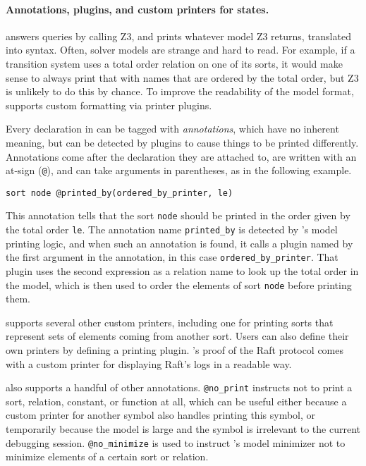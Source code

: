\paragraph{Annotations, plugins, and custom printers for states.}

\mypyvy answers queries by calling Z3,
  and \mypyvy prints whatever model Z3 returns, translated into \mypyvy syntax.
Often, solver models are strange and hard to read.
For example, if a transition system uses a total order relation on one of its sorts,
  it would make sense to always print that with names that are ordered by the total order,
  but Z3 is unlikely to do this by chance.
To improve the readability of the model format,
  \mypyvy supports custom formatting via printer plugins.

Every declaration in \mypyvy can be tagged with \emph{annotations},
  which have no inherent meaning,
  but can be detected by plugins to cause things to be printed differently.
Annotations come after the declaration they are attached to,
  are written with an at-sign (\lstinline[language=mypyvy]{@}),
  and can take arguments in parentheses, as in the following example.
\begin{lstlisting}[language=mypyvy, xleftmargin=.2\textwidth, xrightmargin=.2\textwidth]
  sort node @printed_by(ordered_by_printer, le)
\end{lstlisting}
This annotation tells \mypyvy that the sort \lstinline[language=mypyvy]{node}
  should be printed in the order given by the total order \lstinline[language=mypyvy]{le}.
The annotation name \lstinline[language=mypyvy]{printed_by}
  is detected by \mypyvy's model printing logic,
  and when such an annotation is found,
  it calls a plugin named by the first argument in the annotation,
  in this case \lstinline[language=mypyvy]{ordered_by_printer}.
That plugin uses the second expression as a relation name
  to look up the total order in the model,
  which is then used to order the elements of sort \lstinline[language=mypyvy]{node}
  before printing them.

\mypyvy supports several other custom printers,
  including one for printing sorts
  that represent sets of elements coming from another sort.
Users can also define their own printers by defining a printing plugin.
\mypyvy's proof of the Raft protocol comes with a custom printer
  for displaying Raft's logs in a readable way.

\mypyvy also supports a handful of other annotations.
\lstinline[language=mypyvy]{@no_print} instructs \mypyvy
  not to print a sort, relation, constant, or function at all,
  which can be useful either
  because a custom printer for another symbol also handles printing this symbol, or
  temporarily because the model is large and the symbol is irrelevant to the current debugging session.
\lstinline[language=mypyvy]{@no_minimize} is used
  to instruct \mypyvy's model minimizer not to minimize elements of a certain sort or relation.

